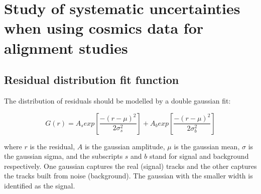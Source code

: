 


\chapter[Analysis systematics]{Study of systematic uncertainties when using cosmics data for alignment studies}
\label{appendix:systematics}




\section{Residual distribution fit function}
\label{appendix:systematics_res_fit_fcn}


The distribution of residuals should be modelled by a double gaussian fit\cite{lefebvre_thesis}:

\begin{equation}
\label{eqn:doub_gaus}
G(r) = A_{s}exp\left[ \frac{-(r-\mu)^{2}}{2\sigma_s^{2}} \right] + A_{b}exp\left[ \frac{-(r-\mu)^{2}}{2\sigma_b^{2}} \right]
\end{equation}

where $r$ is the residual, $A$ is the gaussian amplitude, $\mu$ is the gaussian mean, $\sigma$ is the gaussian sigma, and the subscripts $s$ and $b$ stand for signal and background respectively. One gaussian captures the real (signal) tracks and the other captures the tracks built from noise (background). The gaussian with the smaller width is identified as the signal. 

